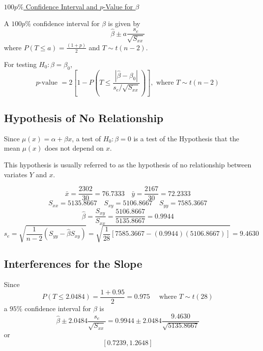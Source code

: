 \underline{$ 100p\% $ Confidence Interval and $ p $-Value for $ \beta $}

A $ 100p\% $ confidence interval for $ \beta $ is given by
\[\hat{\beta} \pm a \frac{s_{e}}{\sqrt{S_{x x}}}\]
where $ P(T\leqslant a)=\frac{(1+p)}{2} $ and $ T\sim t(n-2) $.

For testing $ H_0: \beta=\beta_0 $,
\[p \text {-value }=2\left[1-P\left(T \leq \frac{\left|\hat{\beta}-\beta_{0}\right|}{s_{e} / \sqrt{S_{x x}}}\right)\right], \text { where } T \sim t(n-2)\]

\subsection{Hypothesis of No Relationship}
Since $ \mu(x)=\alpha+\beta x $, a test of $ H_0: \beta=0 $ is a test of the Hypothesis
that the mean $ \mu(x) $ does not depend on $ x $.

This hypothesis is usually referred to as the hypothesis of no relationship
between variates $ Y $ and $ x $.

\begin{exbox}
    \begin{example}
        \[\bar{x}=\frac{2302}{30}=76.7333 \quad \bar{y}=\frac{2167}{30}=72.2333\]
        \[S_{x x}=5135.8667 \quad S_{x y}=5106.8667 \quad S_{y y}=7585.3667\]
        \[\hat{\beta}=\frac{S_{x y}}{S_{x x}}=\frac{5106.8667}{5135.8667}=0.9944\]
        \[s_{e}=\sqrt{\frac{1}{n-2}\left(S_{y y}-\hat{\beta} S_{x y}\right)}
            =\sqrt{\frac{1}{28}[7585.3667-(0.9944)(5106.8667)]}=9.4630\]
    \end{example}
\end{exbox}

\subsection{Interferences for the Slope}
\begin{exbox}
    \begin{example}
        Since
        \[P(T \leq 2.0484)=\frac{1+0.95}{2}=0.975 \quad \text { where } T \sim t(28)\]
        a $ 95\% $ confidence interval for $ \beta $ is
        \[\hat{\beta} \pm 2.0484 \frac{s_{e}}{\sqrt{S_{x x}}}
            =0.9944 \pm 2.0484 \frac{9.4630}{\sqrt{5135.8667}}\]
        or
        \[ \left[ 0.7239,1.2648 \right] \]
    \end{example}
\end{exbox}

